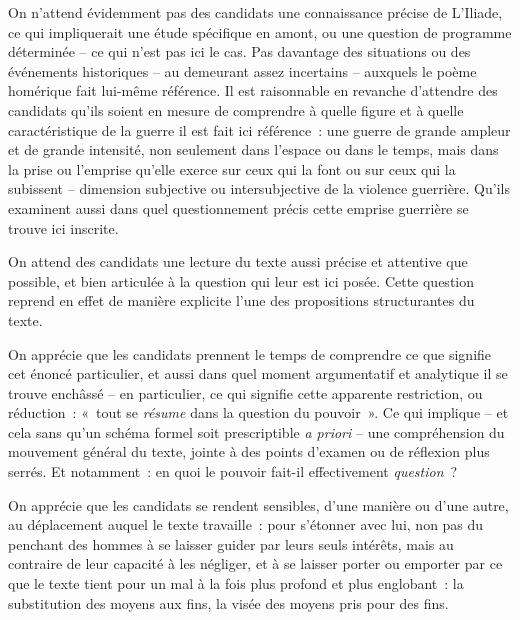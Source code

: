 {On n'attend évidemment pas des candidats une connaissance précise de L'Iliade, ce
qui impliquerait une étude spécifique en amont, ou une question de programme
déterminée – ce qui n'est pas ici le cas. Pas davantage des situations ou des
événements historiques – au demeurant assez incertains – auxquels le poème
homérique fait lui-même référence. Il est raisonnable en revanche d'attendre des
candidats qu'ils soient en mesure de comprendre à quelle figure et à quelle
caractéristique de la guerre il est fait ici référence~: une guerre de grande ampleur et
de grande intensité, non seulement dans l'espace ou dans le temps, mais dans la prise ou l'emprise qu'elle exerce sur ceux qui la font ou sur ceux qui la subissent – dimension
subjective ou intersubjective de la violence guerrière. Qu'ils examinent aussi dans quel
questionnement précis cette emprise guerrière se trouve ici inscrite.

On attend des candidats une lecture du texte aussi précise et attentive que possible,
et bien articulée à la question qui leur est ici posée. Cette question reprend en effet de
manière explicite l'une des propositions structurantes du texte.

On apprécie que les candidats prennent le temps de comprendre ce que signifie cet
énoncé particulier, et aussi dans quel moment argumentatif et analytique il se trouve
enchâssé – en particulier, ce qui signifie cette apparente restriction, ou réduction~:
«~tout se \textit{résume} dans la question du pouvoir~». Ce qui implique – et cela sans qu'un
schéma formel soit prescriptible \textit{a priori} – une compréhension du mouvement général
du texte, jointe à des points d'examen ou de réflexion plus serrés. Et notamment~: en
quoi le pouvoir fait-il effectivement \textit{question}~?

On apprécie que les candidats se rendent sensibles, d'une manière ou d'une autre, au
déplacement auquel le texte travaille~: pour s'étonner avec lui, non pas du penchant
des hommes à se laisser guider par leurs seuls intérêts, mais au contraire de leur
capacité à les négliger, et à se laisser porter ou emporter par ce que le texte tient pour
un mal à la fois plus profond et plus englobant~: la substitution des moyens aux fins, la
visée des moyens pris pour des fins.

}
